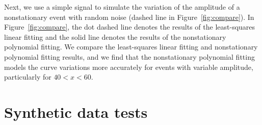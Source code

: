 
Next, we use a simple signal to simulate the variation of the
amplitude of a nonstationary event with random noise (dashed line in
Figure~\ref{fig:compare}). In Figure~\ref{fig:compare}, the dot dashed
line denotes the results of the least-squares linear fitting and the
solid line denotes the results of the nonstationary polynomial
fitting. We compare the least-squares linear fitting and nonstationary
polynomial fitting results, and we find that the nonstationary
polynomial fitting models the curve variations more accurately for
events with variable amplitude, particularly for $40<x<60$.

\section{Synthetic data tests}


